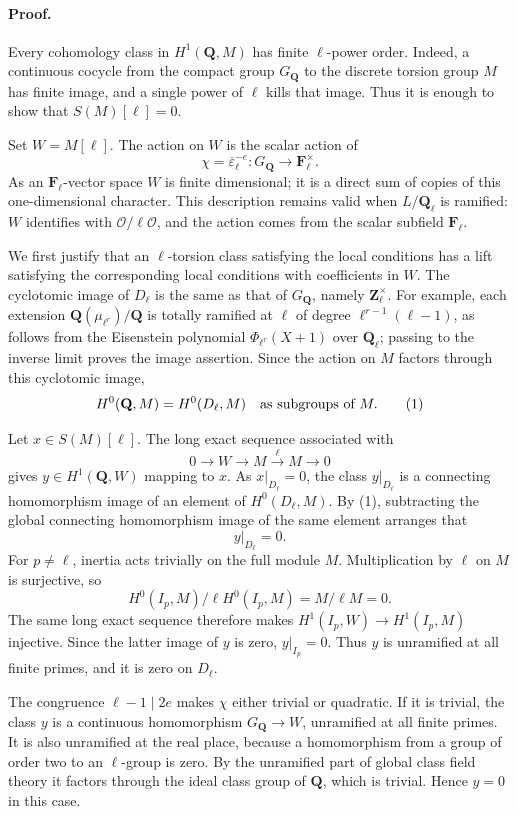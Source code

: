 \documentclass[11pt,a4paper]{article}
\theoremstyle{remark}
\begin{document}
\paragraph{Proof.}
Every cohomology class in $H^1(\mathbf Q,M)$ has finite
$\ell$-power order.  Indeed, a continuous cocycle from the compact
group $G_{\mathbf Q}$ to the discrete torsion group $M$ has finite
image, and a single power of $\ell$ kills that image.  Thus it is
enough to show that $S(M)[\ell]=0$.

Set $W=M[\ell]$.  The action on $W$ is the scalar action of
\[
 \chi=\overline\varepsilon_\ell^{-e}:
 G_{\mathbf Q}\longrightarrow\mathbf F_\ell^\times.
\]
As an $\mathbf F_\ell$-vector space $W$ is finite dimensional; it
is a direct sum of copies of this one-dimensional character.  This
description remains valid when $L/\mathbf Q_\ell$ is ramified:
$W$ identifies with $\mathcal O/\ell\mathcal O$, and the action
comes from the scalar subfield $\mathbf F_\ell$.

We first justify that an $\ell$-torsion class satisfying the local
conditions has a lift satisfying the corresponding local conditions
with coefficients in $W$.  The cyclotomic image of $D_\ell$ is the
same as that of $G_{\mathbf Q}$, namely $\mathbf Z_\ell^\times$.
For example, each extension
$\mathbf Q(\mu_{\ell^r})/\mathbf Q$ is totally ramified at $\ell$
of degree $\ell^{r-1}(\ell-1)$, as follows from the Eisenstein
polynomial $\Phi_{\ell^r}(X+1)$ over $\mathbf Q_\ell$; passing to
the inverse limit proves the image assertion.  Since the action
on $M$ factors through this cyclotomic image,
\[
 H^0(\mathbf Q,M)=H^0(D_\ell,M)
 \quad\hbox{as subgroups of }M.
 \tag{1}
\]

Let $x\in S(M)[\ell]$.  The long exact sequence associated with
\[
 0\longrightarrow W\longrightarrow M
   \xrightarrow{\ \ell\ }M\longrightarrow0
\]
gives $y\in H^1(\mathbf Q,W)$ mapping to $x$.
As $x|_{D_\ell}=0$, the class $y|_{D_\ell}$ is a connecting
homomorphism image of an element of $H^0(D_\ell,M)$.
By (1), subtracting the global connecting homomorphism image of
the same element arranges that
\[
 y|_{D_\ell}=0.
 \tag{2}
\]
For $p\ne\ell$, inertia acts trivially on the full module $M$.
Multiplication by $\ell$ on $M$ is surjective, so
\[
 H^0(I_p,M)/\ell H^0(I_p,M)=M/\ell M=0.
\]
The same long exact sequence therefore makes
$H^1(I_p,W)\to H^1(I_p,M)$ injective.  Since the latter image of
$y$ is zero, $y|_{I_p}=0$.  Thus $y$ is unramified at all finite
primes, and it is zero on $D_\ell$.

The congruence $\ell-1\mid2e$ makes $\chi$ either trivial or
quadratic.  If it is trivial, the class $y$ is a continuous
homomorphism $G_{\mathbf Q}\to W$, unramified at all finite primes.
It is also unramified at the real place, because a homomorphism
from a group of order two to an $\ell$-group is zero.  By the
unramified part of global class field theory it factors through
the ideal class group of $\mathbf Q$, which is trivial.  Hence
$y=0$ in this case.
\end{document}
